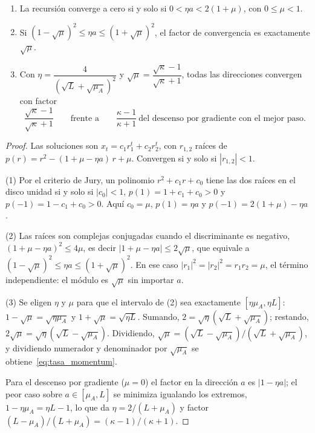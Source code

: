 \begin{proposicion}
\label{prop:momentum}
\begin{enumerate}
  \item La recursión converge a cero si y solo si $0 < \eta a < 2(1 + \mu)$, con $0 \le \mu < 1$.
  \item Si $(1 - \sqrt\mu)^2 \le \eta a \le (1 + \sqrt\mu)^2$, el factor de convergencia es exactamente $\sqrt\mu$.
  \item Con $\eta = \dfrac{4}{(\sqrt L + \sqrt{\mu_A})^2}$ y $\sqrt\mu = \dfrac{\sqrt\kappa - 1}{\sqrt\kappa + 1}$, todas las direcciones
        convergen con factor
        \begin{equation}
          \frac{\sqrt\kappa - 1}{\sqrt\kappa + 1}
          \qquad\text{frente a}\qquad
          \frac{\kappa - 1}{\kappa + 1}
          \ \text{del descenso por gradiente con el mejor paso.}
          \label{eq:tasa_momentum}
        \end{equation}
\end{enumerate}
\end{proposicion}
\begin{proof}
Las soluciones son $x_t = c_1r_1^t + c_2r_2^t$, con $r_{1,2}$ raíces de $p(r) = r^2 - (1 + \mu - \eta a)\,r + \mu$. Convergen si
y solo si $|r_{1,2}| < 1$.

(1) Por el criterio de Jury, un polinomio $r^2 + c_1r + c_0$ tiene las dos raíces en el disco unidad si y solo si $|c_0| < 1$,
$p(1) = 1 + c_1 + c_0 > 0$ y $p(-1) = 1 - c_1 + c_0 > 0$. Aquí $c_0 = \mu$, $p(1) = \eta a$ y $p(-1) = 2(1 + \mu) - \eta a$.

(2) Las raíces son complejas conjugadas cuando el discriminante es negativo, $(1 + \mu - \eta a)^2 \le 4\mu$, es decir
$|1 + \mu - \eta a| \le 2\sqrt\mu$, que equivale a $(1 - \sqrt\mu)^2 \le \eta a \le (1 + \sqrt\mu)^2$. En ese caso
$|r_1|^2 = |r_2|^2 = r_1r_2 = \mu$, el término independiente: el módulo es $\sqrt\mu$ sin importar $a$.

(3) Se eligen $\eta$ y $\mu$ para que el intervalo de (2) sea exactamente $[\eta\mu_A, \eta L]$:
$1 - \sqrt\mu = \sqrt{\eta\mu_A}$ y $1 + \sqrt\mu = \sqrt{\eta L}$. Sumando, $2 = \sqrt\eta(\sqrt L + \sqrt{\mu_A})$; restando,
$2\sqrt\mu = \sqrt\eta(\sqrt L - \sqrt{\mu_A})$. Dividiendo, $\sqrt\mu = (\sqrt L - \sqrt{\mu_A})/(\sqrt L + \sqrt{\mu_A})$, y dividiendo
numerador y denominador por $\sqrt{\mu_A}$ se obtiene~\eqref{eq:tasa_momentum}.

Para el descenso por gradiente ($\mu = 0$) el factor en la dirección $a$ es $|1 - \eta a|$; el peor caso sobre
$a \in [\mu_A, L]$ se minimiza igualando los extremos, $1 - \eta\mu_A = \eta L - 1$, lo que da $\eta = 2/(L + \mu_A)$ y factor
$(L - \mu_A)/(L + \mu_A) = (\kappa - 1)/(\kappa + 1)$.
\end{proof}

